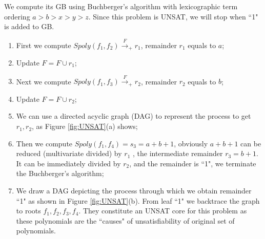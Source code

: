 \begin{Example}
\vspace{0.1in}
We compute its GB using Buchberger's algorithm with lexicographic term ordering $a>b>x>y>z$.
Since this problem is UNSAT, we will stop when ``1" is added to GB.
\begin{enumerate}[{1)}]
\item First we compute $Spoly(f_1,f_2)\xrightarrow{F}_{+} r_1$, remainder $r_1$ equals to $a$;
\item Update $F=F\cup r_1$;
\item Next we compute $Spoly(f_1,f_3)\xrightarrow{F}_{+} r_2$, remainder $r_2$ equals to $b$;
\item Update $F=F\cup r_2$;
\item We can use a directed acyclic graph (DAG) to represent the process to get $r_1,r_2$, as Figure \ref{fig:UNSAT}(a) shows;
\item Then we compute $Spoly(f_1,f_4) = s_3= a+b+1$, obviously $a+b+1$ can be reduced (multivariate divided) by
$r_1$ , the intermediate remainder $r_3 = b+1$. It can be immediately divided by $r_2$, and the remainder is ``1", we
terminate the Buchberger's algorithm;
\item We draw a DAG depicting the process through which we obtain remainder ``1" as shown in Figure \ref{fig:UNSAT}(b). 
From leaf ``1" we backtrace the graph to roots $f_1,f_2,f_3,f_4$. They constitute an UNSAT core for this problem
as these polynomials are the ``causes" of unsatisfiability of original set of polynomials.
\end{enumerate}
\end{Example}
\begin{figure}[hbt]
\end{figure}

